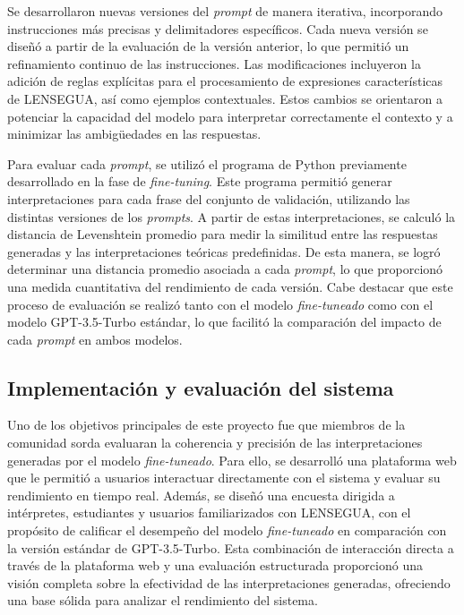 Se desarrollaron nuevas versiones del \textit{prompt} de manera iterativa, incorporando instrucciones más precisas y delimitadores específicos. Cada nueva versión se diseñó a partir de la evaluación de la versión anterior, lo que permitió un refinamiento continuo de las instrucciones. Las modificaciones incluyeron la adición de reglas explícitas para el procesamiento de expresiones características de LENSEGUA, así como ejemplos contextuales. Estos cambios se orientaron a potenciar la capacidad del modelo para interpretar correctamente el contexto y a minimizar las ambigüedades en las respuestas.

Para evaluar cada \textit{prompt}, se utilizó el programa de Python previamente desarrollado en la fase de \textit{fine-tuning}. Este programa permitió generar interpretaciones para cada frase del conjunto de validación, utilizando las distintas versiones de los \textit{prompts}. A partir de estas interpretaciones, se calculó la distancia de Levenshtein promedio para medir la similitud entre las respuestas generadas y las interpretaciones teóricas predefinidas. De esta manera, se logró determinar una distancia promedio asociada a cada \textit{prompt}, lo que proporcionó una medida cuantitativa del rendimiento de cada versión. Cabe destacar que este proceso de evaluación se realizó tanto con el modelo \textit{fine-tuneado} como con el modelo GPT-3.5-Turbo estándar, lo que facilitó la comparación del impacto de cada \textit{prompt} en ambos modelos.

    
\subsection{Implementación y evaluación del sistema}

Uno de los objetivos principales de este proyecto fue que miembros de la comunidad sorda evaluaran la coherencia y precisión de las interpretaciones generadas por el modelo \textit{fine-tuneado}. Para ello, se desarrolló una plataforma web que le permitió a usuarios interactuar directamente con el sistema y evaluar su rendimiento en tiempo real. Además, se diseñó una encuesta dirigida a intérpretes, estudiantes y usuarios familiarizados con LENSEGUA, con el propósito de calificar el desempeño del modelo \textit{fine-tuneado} en comparación con la versión estándar de GPT-3.5-Turbo. Esta combinación de interacción directa a través de la plataforma web y una evaluación estructurada proporcionó una visión completa sobre la efectividad de las interpretaciones generadas, ofreciendo una base sólida para analizar el rendimiento del sistema.


